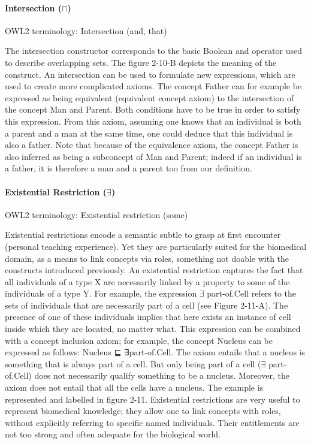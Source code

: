 \paragraph{\textbf{Intersection ($ \sqcap $)}\\}
\label{intersection}
OWL2 terminology: Intersection (and, that)

The intersection constructor corresponds to the basic Boolean and operator used to describe overlapping sets. The figure 2-10-B depicts the meaning of the construct. An intersection can be used to formulate new expressions, which are used to create more complicated axioms. The concept Father can for example be expressed as being equivalent (equivalent concept axiom) to the intersection of the concept Man and Parent. Both conditions have to be true in order to satisfy this expression. From this axiom, assuming one knows that an individual is both a parent and a man at the same time, one could deduce that this individual is also a father. Note that because of the equivalence axiom, the concept Father is also inferred as being a subconcept of Man and Parent; indeed if an individual is a father, it is therefore a man and a parent too from our definition.

\paragraph{\textbf{Existential Restriction  ($ \exists $)}\\}
\label{exists}
OWL2 terminology: Existential restriction (some)

Existential restrictions encode a semantic subtle to grasp at first encounter (personal teaching experience). Yet they are particularly suited for the biomedical domain, as a means to link concepts via roles, something not doable with the constructs introduced previously. An existential restriction captures the fact that all individuals of a type X are necessarily linked by a property to some of the individuals of a type Y. For example, the expression $ \exists $ part-of.Cell refers to the sets of individuals that are necessarily part of a cell (see Figure 2-11-A). The presence of one of these individuals implies that here exists an instance of cell inside which they are located, no matter what. This expression can be combined with a concept inclusion axiom; for example, the concept Nucleus can be expressed as follows: Nucleus ⊑ ∃part-of.Cell. The axiom entails that a nucleus is something that is always part of a cell. But only being part of a cell ($ \exists $ part-of.Cell) does not necessarily qualify something to be a nucleus. Moreover, the axiom does not entail that all the cells have a nucleus. The example is represented and labelled in figure 2-11. Existential restrictions are very useful to represent biomedical knowledge; they allow one to link concepts with roles, without explicitly referring to specific named individuals. Their entitlements are not too strong and often adequate for the biological world.

